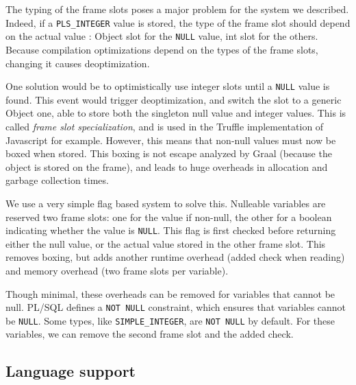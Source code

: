 \documentclass[twoside,11pt,a4paper]{article}
\newcommand{\java}[1]{\textsf{#1}}
\newcommand{\pls}[1]{\small\texttt{#1}\normalsize}
\newcommand{\plstype}[1]{\pls{#1}}
\newcommand{\plsi}{\plstype{PLS\_INTEGER}}
\newcommand{\simpleint}{\plstype{SIMPLE\_INTEGER}}
\newcommand{\plsnull}{\pls{NULL}}
\begin{document}
The typing of the frame slots poses a major problem for the system we described. Indeed, if a \plsi{} value is stored, the type of the frame slot should depend on the actual value : \java{Object} slot for the \plsnull{} value, \java{int} slot for the others. Because compilation optimizations depend on the types of the frame slots, changing it causes deoptimization.

One solution would be to optimistically use integer slots until a \plsnull{} value is found. This event would trigger deoptimization, and switch the slot to a generic \java{Object} one, able to store both the singleton null value and integer values. This is called \textit{frame slot specialization}, and is used in the Truffle implementation of Javascript for example. However, this means that non-null values must now be boxed when stored. This boxing is not escape analyzed by Graal (because the object is stored on the frame), and leads to huge overheads in allocation and garbage collection times.

We use a very simple flag based system to solve this. Nulleable variables are reserved two frame slots: one for the value if non-null, the other for a \java{boolean} indicating whether the value is \plsnull{}. This flag is first checked before returning either the null value, or the actual value stored in the other frame slot. This removes boxing, but adds another runtime overhead (added check when reading) and memory overhead (two frame slots per variable).

Though minimal, these overheads can be removed for variables that cannot be null. PL/SQL defines a \pls{NOT NULL} constraint, which ensures that variables cannot be \plsnull{}. Some types, like \simpleint{}, are \pls{NOT NULL} by default. For these variables, we can remove the second frame slot and the added check.

\subsection{Language support}

\end{document}
